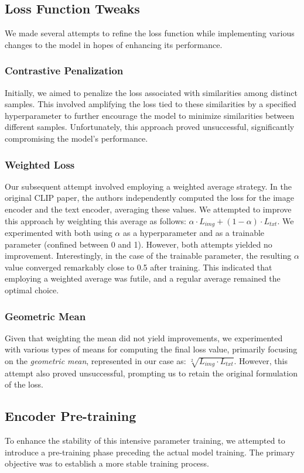 \documentclass[12pt, a4paper]{article}
\begin{document}
\subsection{Loss Function Tweaks}
We made several attempts to refine the loss function while implementing various changes to the model in hopes of enhancing its performance.

\subsubsection{Contrastive Penalization}
Initially, we aimed to penalize the loss associated with similarities among distinct samples. This involved amplifying the loss tied to these similarities by a specified hyperparameter to further encourage the model to minimize similarities between different samples. Unfortunately, this approach proved unsuccessful, significantly compromising the model's performance.

\subsubsection{Weighted Loss}
Our subsequent attempt involved employing a weighted average strategy. In the original CLIP paper, the authors independently computed the loss for the image encoder and the text encoder, averaging these values. We attempted to improve this approach by weighting this average as follows: $\alpha \cdot L_{img} + (1 - \alpha) \cdot L_{txt}$. We experimented with both using $\alpha$ as a hyperparameter and as a trainable parameter (confined between 0 and 1). However, both attempts yielded no improvement. Interestingly, in the case of the trainable parameter, the resulting $\alpha$ value converged remarkably close to 0.5 after training. This indicated that employing a weighted average was futile, and a regular average remained the optimal choice.


\subsubsection{Geometric Mean}
Given that weighting the mean did not yield improvements, we experimented with various types of means for computing the final loss value, primarily focusing on the \textit{geometric mean}, represented in our case as: $\sqrt[2]{L_{img} \cdot L_{txt}}$. However, this attempt also proved unsuccessful, prompting us to retain the original formulation of the loss.

\subsection{Encoder Pre-training}
To enhance the stability of this intensive parameter training, we attempted to introduce a pre-training phase preceding the actual model training. The primary objective was to establish a more stable training process.
\end{document}
